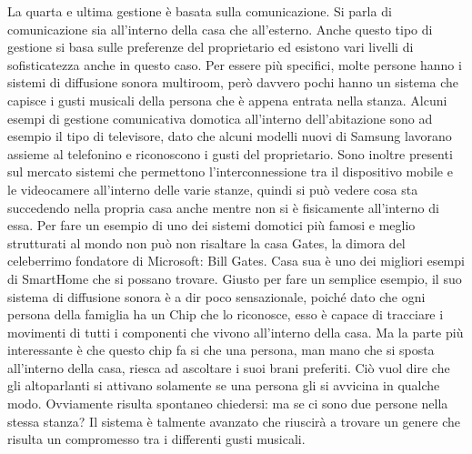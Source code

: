 La quarta e ultima gestione è basata sulla comunicazione. Si parla di comunicazione sia all’interno della casa che all’esterno. Anche questo tipo di gestione si basa sulle preferenze del proprietario ed esistono vari livelli di sofisticatezza anche in questo caso. Per essere più specifici, molte persone hanno i sistemi di diffusione sonora multiroom, però davvero pochi hanno un sistema che capisce i gusti musicali della persona che è appena entrata nella stanza. 
Alcuni esempi di gestione comunicativa domotica all’interno dell’abitazione sono ad esempio il tipo di televisore, dato che alcuni modelli nuovi di Samsung lavorano assieme al telefonino e riconoscono i gusti del proprietario. Sono inoltre presenti sul mercato sistemi che permettono l’interconnessione tra il dispositivo mobile e le videocamere all’interno delle varie stanze, quindi si può vedere cosa sta succedendo nella propria casa anche mentre non si è fisicamente all’interno di essa.
Per fare un esempio di uno dei sistemi domotici più famosi e meglio strutturati al mondo non può non risaltare la casa Gates, la dimora del celeberrimo fondatore di Microsoft: Bill Gates. 
Casa sua è uno dei migliori esempi di SmartHome che si possano trovare. Giusto per fare un semplice esempio, il suo sistema di diffusione sonora è a dir poco sensazionale, poiché dato che ogni persona della famiglia ha un Chip che lo riconosce, esso è capace di tracciare i movimenti di tutti i componenti che vivono all’interno della casa. Ma la parte più interessante è che questo chip fa si che una persona, man mano che si sposta all’interno della casa, riesca ad ascoltare i suoi brani preferiti. Ciò vuol dire che gli altoparlanti si attivano solamente se una persona gli si avvicina in qualche modo. Ovviamente risulta spontaneo chiedersi: ma se ci sono due persone nella stessa stanza? Il sistema è talmente avanzato che riuscirà a trovare un genere che risulta un compromesso tra i differenti gusti musicali. 
